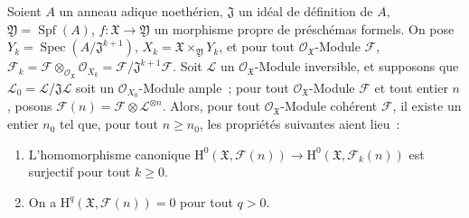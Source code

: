 \begin{proposition}[5.2.3]
\label{III.5.2.3-fr}
Soient $A$ un anneau adique noethérien, $\mathfrak J$ un idéal de définition de
$A$, $\mathfrak Y=\operatorname{Spf}(A)$,
$f:\mathfrak X\to\mathfrak Y$ un morphisme propre de préschémas formels. On pose
$Y_k=\operatorname{Spec}(A/\mathfrak J^{k+1})$,
$X_k=\mathfrak X\times_{\mathfrak Y}Y_k$, et pour tout
$\mathcal O_{\mathfrak X}$-Module $\mathcal F$,
$\mathcal F_k=\mathcal F\otimes_{\mathcal O_{\mathfrak X}}\mathcal O_{X_k}
=\mathcal F/\mathfrak J^{k+1}\mathcal F$.
Soit $\mathcal L$ un $\mathcal O_{\mathfrak X}$-Module inversible, et supposons que
$\mathcal L_0=\mathcal L/\mathfrak J\mathcal L$ soit un
$\mathcal O_{X_0}$-Module ample~; pour tout $\mathcal O_{\mathfrak X}$-Module
$\mathcal F$ et tout entier $n$, posons
$\mathcal F(n)=\mathcal F\otimes\mathcal L^{\otimes n}$. Alors, pour tout
$\mathcal O_{\mathfrak X}$-Module cohérent $\mathcal F$, il existe un entier $n_0$
tel que, pour tout $n\geq n_0$, les propriétés suivantes aient lieu~:
\begin{enumerate}
\item[\textup{(i)}] L'homomorphisme canonique
$\mathrm H^0(\mathfrak X,\mathcal F(n))\to
\mathrm H^0(\mathfrak X,\mathcal F_k(n))$ est surjectif pour tout $k\geq0$.
\item[\textup{(ii)}] On a $\mathrm H^q(\mathfrak X,\mathcal F(n))=0$ pour tout $q>0$.
\end{enumerate}
\end{proposition}

